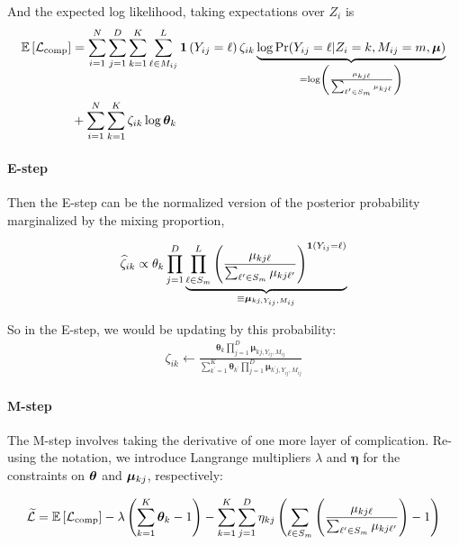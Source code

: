 \documentclass[11pt]{article}
\begin{document}
And the expected log likelihood, taking expectations over \(Z_i\) is 
\begin{align}
\mathbb{E}\left[\mathcal{L}_{\text{comp}}\right] &= \sum^{N}_{i=1}\sum^{D}_{j=1}\sum^{K}_{k=1}\sum^{L}_{\ell \in M_{ij}}\bm{1}\left(Y_{ij} = \ell\right)\zeta_{ik}\underbrace{\log \Pr(Y_{ij} = \ell | Z_{i} = k, M_{ij} = m, \bm{\mu})}_{=\log \left(\frac{\mu_{kj\ell}}{\sum_{\ell^\prime \in S_{m}} \mu_{kj\ell}}\right)}\nonumber\\
& + \sum^{N}_{i=1}\sum^{K}_{k=1}\zeta_{ik}\log \bm{\theta}_{k}
\end{align}

\paragraph{E-step} Then the E-step can be the normalized version of the posterior probability marginalized by the mixing proportion,

\begin{align}
\widehat{\zeta}_{ik} \propto \theta_k\prod^{D}_{j = 1}\underbrace{\prod^{L}_{\ell \in S_m}\left(\frac{\mu_{kj\ell}}{\sum_{\ell^\prime \in S_{m}} \mu_{kj\ell^\prime}}\right)^{\bm{1}\left(Y_{ij} = \ell\right)}}_{\equiv \bm{\mu}_{kj, Y_{ij}, M_{ij}}}
\end{align}

So in the E-step, we would be updating by this probability:
\begin{align}
\zeta_{ik} \leftarrow \frac{\bm{\theta}_{k}\prod^{D}_{j=1}\bm{\mu}_{kj,Y_{ij}, M_{ij}}}
{\sum^{K}_{k^\prime=1}\bm{\theta}_{k^\prime}\prod^{D}_{j=1}\bm{\mu}_{k^\prime j,Y_{ij}, M_{ij}}}
\end{align}

\paragraph{M-step}  The M-step involves taking the derivative of one more layer of complication. Re-using the notation,  we introduce Langrange multipliers \(\lambda\) and \(\bm{\eta}\) for the constraints on \(\bm{\theta}\) and \(\bm{\mu}_{kj}\), respectively:

\begin{align}
\widetilde{\mathcal{L}} = \mathbb{E}\left[\mathcal{L}_\text{comp}\right] - \lambda\left(\sum^{K}_{k=1}\bm{\theta}_k - 1\right) - \sum^{K}_{k=1}\sum^{D}_{j=1}\eta_{kj}\left(\sum_{\ell \in S_{m}}\left(\frac{\mu_{kj\ell}}{\sum_{\ell^\prime \in S_{m}} \mu_{kj\ell^\prime}}\right) - 1\right) \nonumber
\end{align}
\end{document}
